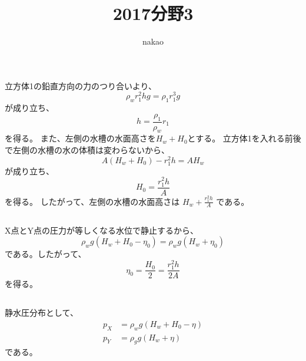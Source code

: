 \documentclass[a4paper]{jsarticle}
\begin{document}
\title{2017分野3}
\author{nakao}
\maketitle

\section{}
\subsection{}
立方体1の鉛直方向の力のつり合いより、
\begin{equation}
  \rho_w r_1^2 h g = \rho_1 r_1^3 g
\end{equation}
が成り立ち、
\begin{equation}
  h = \frac{\rho_1}{\rho_w} r_1
\end{equation}
を得る。
また、左側の水槽の水面高さを$H_w + H_0$とする。
立方体1を入れる前後で左側の水槽の水の体積は変わらないから、
\begin{equation}
  A (H_w + H_0) - r_1^2 h = A H_w
\end{equation}
が成り立ち、
\begin{equation}
  H_0 = \frac{r_1^2 h}{A}
\end{equation}
を得る。
したがって、左側の水槽の水面高さは
$H_w + \frac{r_1^2 h}{A}$
である。
\subsection{}
X点とY点の圧力が等しくなる水位で静止するから、
\begin{equation}
  \rho_w g (H_w + H_0 - \eta_0)
  = \rho_w g (H_w + \eta_0)
\end{equation}
である。したがって、
\begin{equation}
  \eta_0 = \frac{H_0}{2} = \frac{r_1^2 h}{2 A}
\end{equation}
を得る。

\subsection{}
\subsubsection{}
静水圧分布として、
\begin{align}
  p_X &= \rho_w g (H_w + H_0 - \eta) \\
  p_Y &= \rho_g g (H_w + \eta)
\end{align}
である。
\end{document}
